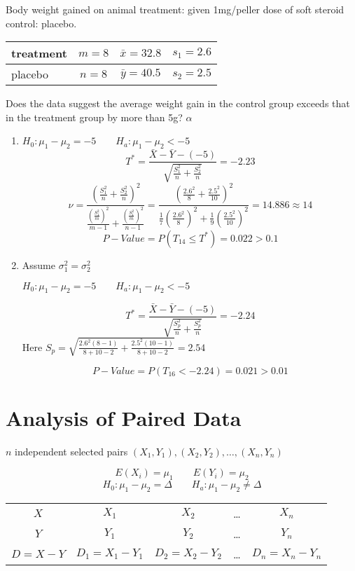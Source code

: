 \begin{exmp}
Body weight gained on animal treatment: given 1mg/peller dose of soft steroid control: placebo.

\begin{center}
\begin{tabular}{l|c|c|c}
\hline
treatment & $m=8$ & $\bar{x}=32.8$ & $s_1=2.6$ \\
\hline
placebo & $n=8$ & $\bar{y}=40.5$ & $s_2=2.5$ \\
\hline
\end{tabular}
\end{center}


Does the data suggest the average weight gain in the control group exceeds that in the treatment group by more than 5g? $\alpha$

\begin{enumerate}
\item $H_0:\mu_1-\mu_2 = -5 \qquad H_a:\mu_1-\mu_2 < -5$
\[T^*=\frac{\bar{X}-\bar{Y}-(-5)}{\sqrt{\frac{S_1^2}{n}+\frac{S_2^2}{n}}}=-2.23 \]
\[\nu=\frac{\left( \frac{S_1^2}{n}+\frac{S_2^2}{n} \right)^2}{ \frac{\left( \frac{S_1^2}{m} \right)^2}{m-1}+ \frac{\left( \frac{S_1^2}{m} \right)^2}{n-1}  }=\frac{\left(\frac{2.6^2}{8}+\frac{2.5^2}{10}\right)^2}{\frac{1}{7} \left(\frac{2.6^2}{8}\right)^2+\frac{1}{9} \left(\frac{2.5^2}{10}\right)^2}=14.886 \approx 14\]
\[P-Value=P(T_{14}\leq T^*)=0.022>0.1\]
\item Assume $\sigma_1^2=\sigma_2^2$

$H_0:\mu_1-\mu_2 = -5 \qquad H_a:\mu_1-\mu_2 < -5$

\[T^*=\frac{\bar{X}-\bar{Y}-(-5)}{\sqrt{\frac{S_p^2}{n}+\frac{S_p^2}{n}}}=-2.24\]
Here $S_p=\sqrt{\frac{2.6^2 (8-1)}{8+10-2}+\frac{2.5^2 (10-1)}{8+10-2}}=2.54$

\[P-Value=P(T_{16}<-2.24)=0.021>0.01\]

\end{enumerate}
\end{exmp}

\section{Analysis of Paired Data}
$n$ independent selected pairs
$(X_1,Y_1),(X_2,Y_2),\dots,(X_n,Y_n)$

\[E(X_i)=\mu_1 \qquad E(Y_i)=\mu_2\]
\[H_0:\mu_1-\mu_2=\Delta \qquad H_a:\mu_1-\mu_2 \neq\Delta\]
\begin{center}
\begin{tabular}{ccccc}
\hline
$X$ & $X_1$ & $X_2$ & \dots & $X_n$ \\ 
$Y$ & $Y_1$ & $Y_2$ & \dots & $Y_n$ \\ 
$D=X-Y$ & $D_1=X_1-Y_1$ & $D_2=X_2-Y_2$ & \dots & $D_n=X_n-Y_n$ \\
\hline
\end{tabular}
\end{center}

